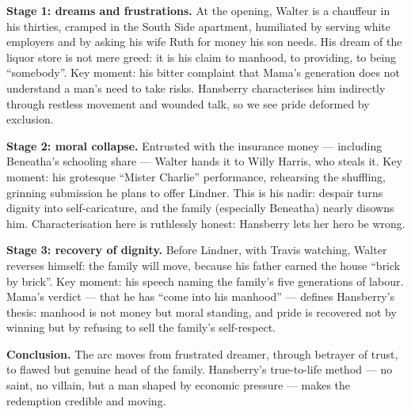 \documentclass[11pt]{article}
\begin{document}
\begin{corrige}
\textbf{Stage 1: dreams and frustrations.} At the opening, Walter is a chauffeur in his thirties, cramped in the South Side apartment, humiliated by serving white employers and by asking his wife Ruth for money his son needs. His dream of the liquor store is not mere greed: it is his claim to manhood, to providing, to being ``somebody''. Key moment: his bitter complaint that Mama's generation does not understand a man's need to take risks. Hansberry characterises him indirectly through restless movement and wounded talk, so we see pride deformed by exclusion.

\textbf{Stage 2: moral collapse.} Entrusted with the insurance money --- including Beneatha's schooling share --- Walter hands it to Willy Harris, who steals it. Key moment: his grotesque ``Mister Charlie'' performance, rehearsing the shuffling, grinning submission he plans to offer Lindner. This is his nadir: despair turns dignity into self-caricature, and the family (especially Beneatha) nearly disowns him. Characterisation here is ruthlessly honest: Hansberry lets her hero be wrong.

\textbf{Stage 3: recovery of dignity.} Before Lindner, with Travis watching, Walter reverses himself: the family will move, because his father earned the house ``brick by brick''. Key moment: his speech naming the family's five generations of labour. Mama's verdict --- that he has ``come into his manhood'' --- defines Hansberry's thesis: manhood is not money but moral standing, and pride is recovered not by winning but by refusing to sell the family's self-respect.

\textbf{Conclusion.} The arc moves from frustrated dreamer, through betrayer of trust, to flawed but genuine head of the family. Hansberry's true-to-life method --- no saint, no villain, but a man shaped by economic pressure --- makes the redemption credible and moving.
\end{corrige}
\end{document}

